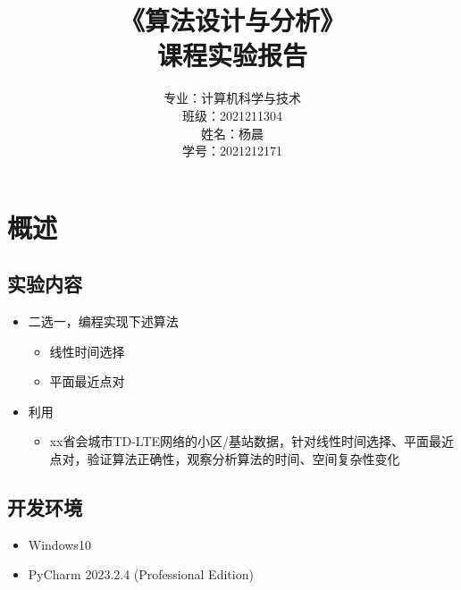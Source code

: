\documentclass[lang=cn,11pt,a4paper]{elegantpaper}
\title{《算法设计与分析》\\课程实验报告}
\author{
\huge 专业：计算机科学与技术 \\[10pt]
\huge 班级：2021211304 \\[10pt]
\huge 姓名：杨晨 \\[10pt]
\huge 学号：2021212171
}
\date{}
\begin{document}
\maketitle

\clearpage



\section{概述}

\subsection{实验内容}

\begin{itemize}
    \item 二选一，编程实现下述算法
    \begin{itemize}
        \item 线性时间选择
        \item 平面最近点对
    \end{itemize}
    \item 利用
    \begin{itemize}
        \item xx省会城市TD-LTE网络的小区/基站数据，针对线性时间选择、平面最近点对，验证算法正确性，观察分析算法的时间、空间复杂性变化
    \end{itemize}
\end{itemize}

\subsection{开发环境}

\begin{itemize}
    \item Windows10
    \item PyCharm 2023.2.4 (Professional Edition)
\end{itemize}
\end{document}
